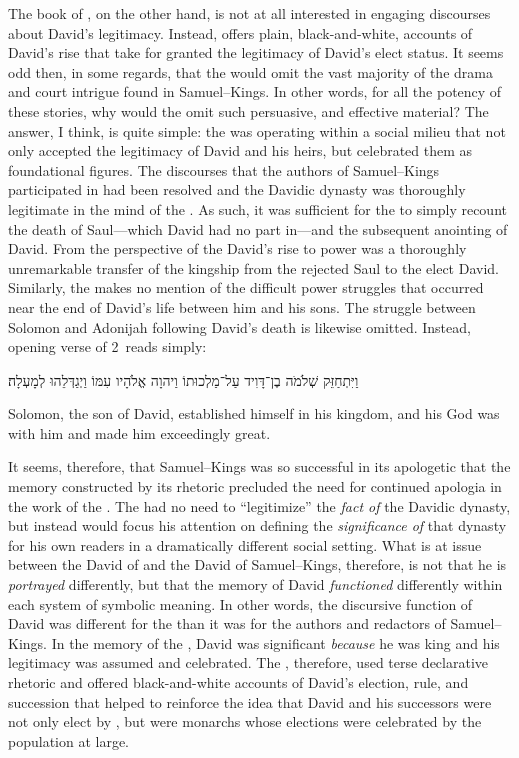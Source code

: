 The book of \chronicles, on the other hand, is not at all interested in engaging discourses about David's legitimacy. Instead, \chronicles offers plain, black-and-white, accounts of David's rise that take for granted the legitimacy of David's elect status. It seems odd then, in some regards, that the \chronicler would omit the vast majority of the drama and court intrigue found in Samuel--Kings. In other words, for all the potency of these stories, why would the \chronicler omit such persuasive, and effective material? The answer, I think, is quite simple: the \chronicler was operating within a social milieu that not only accepted the legitimacy of David and his heirs, but celebrated them as foundational figures. The discourses that the authors of Samuel--Kings participated in had been resolved and the Davidic dynasty was thoroughly legitimate in the mind of the \chronicler. As such, it was sufficient for the \chronicler to simply recount the death of Saul---which David had no part in---and the subsequent anointing of David. From the perspective of the \chronicler David's rise to power was a thoroughly unremarkable transfer of the kingship from the rejected Saul to the elect David. Similarly, the \chronicler makes no mention of the difficult power struggles that occurred near the end of David's life between him and his sons. The struggle between Solomon and Adonijah following David's death is likewise omitted. Instead, opening verse of 2~\chronicles reads simply:
    \begin{hebrewtext}
        וַיִּתְחַזֵּק שְׁלֹמֹה בֶן־דָּוִיד עַל־מַלְכוּתוֹ וַיהוָה אֱלֹהָיו עִמּוֹ וַיְגַדְּלֵהוּ לְמָעְלָה׃
    \end{hebrewtext}
    \begin{translation}
        Solomon, the son of David, established himself in his kingdom, and \yahweh his God was with him and made him exceedingly great.   
    \end{translation}
\noindent
It seems, therefore, that Samuel--Kings was so successful in its apologetic that the memory constructed by its rhetoric precluded the need for continued apologia in the work of the \chronicler. The \chronicler had no need to ``legitimize'' the \emph{fact of} the Davidic dynasty, but instead would focus his attention on defining the \emph{significance of} that dynasty for his own readers in a dramatically different social setting. What is at issue between the David of \chronicles and the David of Samuel--Kings, therefore, is not that he is \emph{portrayed} differently, but that the memory of David \emph{functioned} differently within each system of symbolic meaning. In other words, the discursive function of David was different for the \chronicler than it was for the authors and redactors of Samuel--Kings. In the memory of the \chronicler, David was significant \emph{because} he was king and his legitimacy was assumed and celebrated. The \chronicler, therefore, used terse declarative rhetoric and offered black-and-white accounts of David's election, rule, and succession that helped to reinforce the idea that David and his successors were not only elect by \yahweh, but were monarchs whose elections were celebrated by the population at large.

